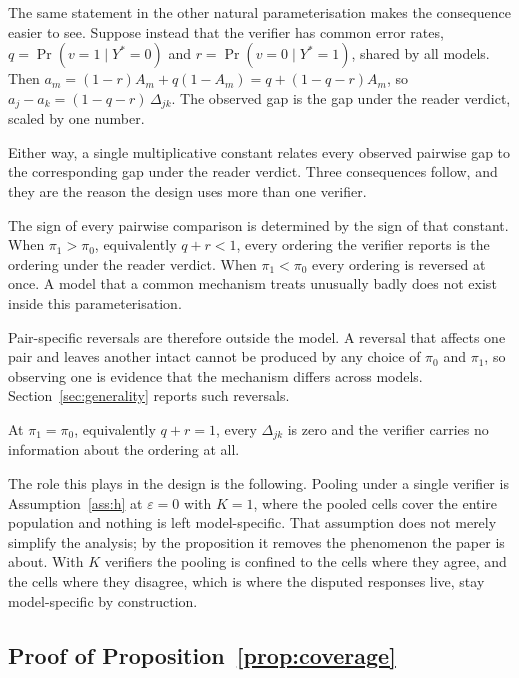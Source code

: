 The same statement in the other natural parameterisation makes the consequence easier to see.
Suppose instead that the verifier has common error rates, $q = \Pr(v = 1 \mid Y^\ast = 0)$ and
$r = \Pr(v = 0 \mid Y^\ast = 1)$, shared by all models. Then
$a_m = (1-r) A_m + q (1 - A_m) = q + (1 - q - r) A_m$, so
$a_j - a_k = (1 - q - r)\,\Delta_{jk}$. The observed gap is the gap under the reader verdict,
scaled by one number.

Either way, a single multiplicative constant relates every observed pairwise gap to the
corresponding gap under the reader verdict. Three consequences follow, and they are the reason the design uses
more than one verifier.

The sign of every pairwise comparison is determined by the sign of that constant. When
$\pi_1 > \pi_0$, equivalently $q + r < 1$, every ordering the verifier reports is the ordering
under the reader verdict. When $\pi_1 < \pi_0$ every ordering is reversed at once. A model that a common
mechanism treats unusually badly does not exist inside this parameterisation.

Pair-specific reversals are therefore outside the model. A reversal that affects one pair and
leaves another intact cannot be produced by any choice of $\pi_0$ and $\pi_1$, so observing
one is evidence that the mechanism differs across models. Section~\ref{sec:generality} reports
such reversals.

At $\pi_1 = \pi_0$, equivalently $q + r = 1$, every $\Delta_{jk}$ is zero and the verifier
carries no information about the ordering at all.

The role this plays in the design is the following. Pooling under a single verifier is
Assumption~\ref{ass:h} at $\varepsilon = 0$ with $K = 1$, where the pooled cells cover the
entire population and nothing is left model-specific. That assumption does not merely
simplify the analysis; by the proposition it removes the phenomenon the paper is about. With
$K$ verifiers the pooling is confined to the cells where they agree, and the cells where they
disagree, which is where the disputed responses live, stay model-specific by construction.

\subsection{Proof of Proposition~\ref{prop:coverage}}

